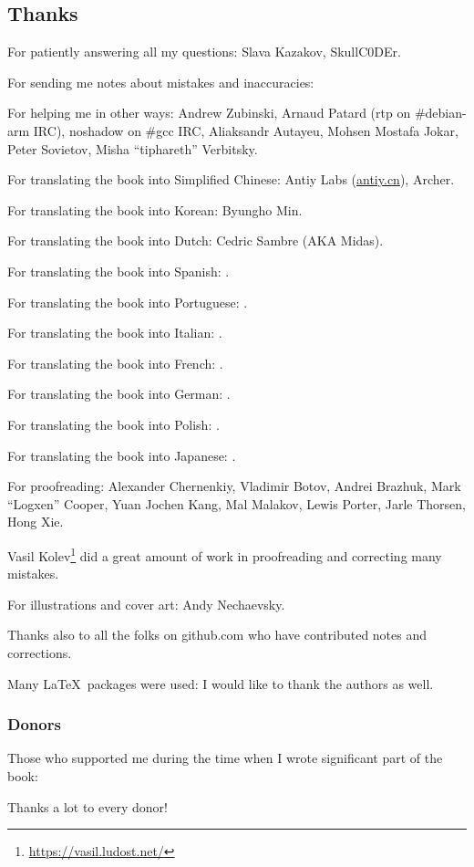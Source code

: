 \subsection*{Thanks}

For patiently answering all my questions: Slava  Kazakov, SkullC0DEr.

For sending me notes about mistakes and inaccuracies: \PeopleMistakesInaccuracies{}

For helping me in other ways:
Andrew Zubinski,
Arnaud Patard (rtp on \#debian-arm IRC),
noshadow on \#gcc IRC,
Aliaksandr Autayeu,
Mohsen Mostafa Jokar,
Peter Sovietov,
Misha ``tiphareth'' Verbitsky.

For translating the book into Simplified Chinese:
Antiy Labs (\href{http://antiy.cn}{antiy.cn}), Archer.

For translating the book into Korean: Byungho Min.

For translating the book into Dutch: Cedric Sambre (AKA Midas).

For translating the book into Spanish: \PeopleSpanishTranslators{}.

For translating the book into Portuguese: \PeoplePTBRTranslators{}.

For translating the book into Italian: \PeopleItalianTranslators{}.

For translating the book into French: \PeopleFrenchTranslators{}.

For translating the book into German: \PeopleGermanTranslators{}.

For translating the book into Polish: \PeoplePolishTranslators{}.

For translating the book into Japanese: \PeopleJapaneseTranslators{}.

For proofreading:
Alexander  Chernenkiy,
Vladimir Botov,
Andrei Brazhuk,
Mark ``Logxen'' Cooper, Yuan Jochen Kang, Mal Malakov, Lewis Porter, Jarle Thorsen, Hong Xie.

Vasil Kolev\footnote{\url{https://vasil.ludost.net/}} did a great amount of work in proofreading and correcting many mistakes.

For illustrations and cover art: Andy Nechaevsky.

Thanks also to all the folks on github.com who have contributed notes and corrections\FNGithubContributors{}.

Many \LaTeX\ packages were used: I would like to thank the authors as well.

\subsubsection*{Donors}

Those who supported me during the time when I wrote significant part of the book:



Thanks a lot to every donor!
